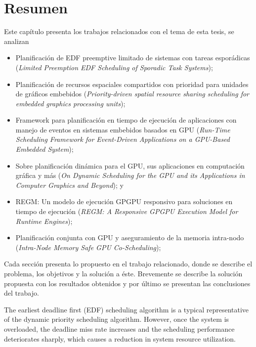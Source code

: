 \section{Resumen}
Este capítulo presenta los trabajos relacionados con el tema de esta tesis, se analizan 
\begin{itemize}
	\item Planificación de EDF preemptive limitado de sistemas con tareas esporádicas
	 (\textit{Limited Preemption EDF Scheduling of Sporadic Task Systems});
	 \item Planificación de recursos espaciales compartidos con prioridad para unidades de gráficos embebidos 
	 (\textit{Priority-driven spatial resource sharing scheduling for embedded graphics processing units});
	\item Framework para planificación en tiempo de ejecución de aplicaciones con manejo de eventos en sistemas embebidos basados en GPU 
	(\textit{Run-Time Scheduling Framework for Event-Driven Applications on a GPU-Based Embedded System});
	\item Sobre planificación dinámica para el GPU, sus aplicaciones en computación gráfica y más
	(\textit{On Dynamic Scheduling for the GPU and its Applications in Computer Graphics and Beyond}); y
	\item REGM: Un modelo de ejecución GPGPU responsivo para soluciones en tiempo de ejecución
	(\textit{REGM: A Responsive GPGPU Execution Model for Runtime Engines});
    	\item Planificación conjunta con GPU y aseguramiento de la memoria intra-nodo 
	(\textit{Intra-Node Memory Safe GPU Co-Scheduling});
 \end{itemize}

\vspace{0.3cm}
Cada sección presenta lo propuesto en el trabajo relacionado, donde se describe el problema, los objetivos y la solución a éste. Brevemente se describe la solución propuesta con los resultados obtenidos y por último se presentan las conclusiones del trabajo.





The earliest deadline first (EDF) scheduling algorithm is a typical representative of the dynamic priority scheduling algorithm. However, once the system is overloaded, the deadline miss rate increases and the scheduling performance deteriorates sharply, which causes a reduction in system resource utilization.

